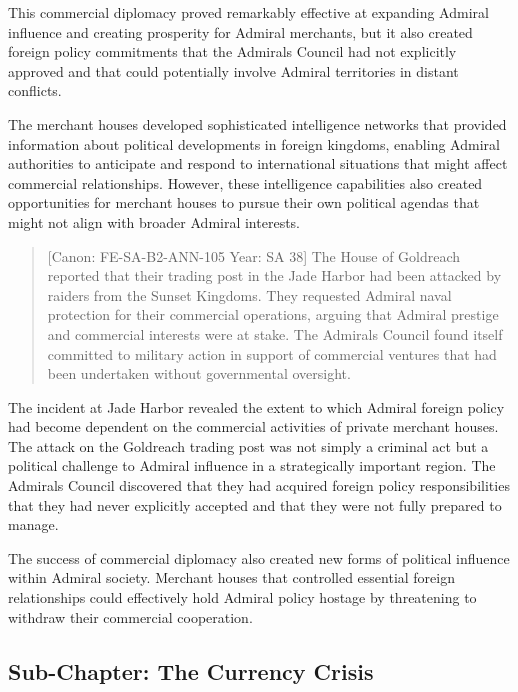 This commercial diplomacy proved remarkably effective at expanding
Admiral influence and creating prosperity for Admiral merchants, but it
also created foreign policy commitments that the
Admiral\textquotesingle s Council had not explicitly approved and that
could potentially involve Admiral territories in distant conflicts.

The merchant houses developed sophisticated intelligence networks that
provided information about political developments in foreign kingdoms,
enabling Admiral authorities to anticipate and respond to international
situations that might affect commercial relationships. However, these
intelligence capabilities also created opportunities for merchant houses
to pursue their own political agendas that might not align with broader
Admiral interests.

\begin{quote}
{[}Canon: FE-SA-B2-ANN-105 \textbar{} Year: SA 38{]} The House of
Goldreach reported that their trading post in the Jade Harbor had been
attacked by raiders from the Sunset Kingdoms. They requested Admiral
naval protection for their commercial operations, arguing that Admiral
prestige and commercial interests were at stake. The
Admiral\textquotesingle s Council found itself committed to military
action in support of commercial ventures that had been undertaken
without governmental oversight.
\end{quote}

The incident at Jade Harbor revealed the extent to which Admiral foreign
policy had become dependent on the commercial activities of private
merchant houses. The attack on the Goldreach trading post was not simply
a criminal act but a political challenge to Admiral influence in a
strategically important region. The Admiral\textquotesingle s Council
discovered that they had acquired foreign policy responsibilities that
they had never explicitly accepted and that they were not fully prepared
to manage.

The success of commercial diplomacy also created new forms of political
influence within Admiral society. Merchant houses that controlled
essential foreign relationships could effectively hold Admiral policy
hostage by threatening to withdraw their commercial cooperation.

\subsection{Sub-Chapter: The Currency
Crisis}\label{sub-chapter-the-currency-crisis}

